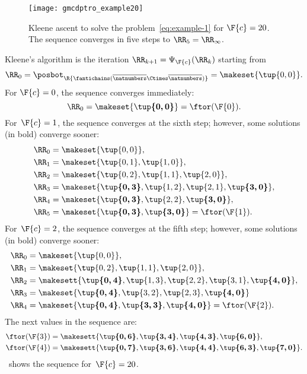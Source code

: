 \begin{figure}
    \centering
    \texttt{[image: gmcdptro\_example20]}
    \caption{
        Kleene ascent to solve the problem~\cref{eq:example-1} for $\F{c}=20$.
        The sequence converges in five steps to $\RR_{5}=\RR_{\infty}$.
    }
    \label{fig:example24}
\end{figure}
%
Kleene's algorithm is the iteration $\RR_{k+1}=\Psi_{\F{c}}(\RR_{k})$ starting from
\begin{equation}
    \RR_{0}
    =
    \posbot_{\R{\fantichains(\overline{\natnumbers}\Ctimes\overline{\natnumbers})}}
    =\makeset{\tup{ 0,0} }.
\end{equation}
%
For $\F{c}=0$, the sequence converges immediately:
%
\begin{equation}
    \RR_{0}=\makeset{\boldsymbol{\tup{0,0}}}=\ftor(\F{0}).
\end{equation}
%
For~$\F{c}=1$, the sequence converges at the sixth step; however, some solutions (in bold) converge sooner:
%
\begin{align*}
    \RR_{0} & =\makeset{\tup{0,0} }, \\
    \RR_{1} & =\makeset{\tup{0,1},\tup{1,0}}, \\
    \RR_{2} & =\makeset{\tup{0,2},\tup{1,1}, \tup{2,0}}, \\
    \RR_{3} & =\makeset{\boldsymbol{\tup{0,3}},\tup{1,2}, \tup{2,1},\boldsymbol{\tup{3,0}}}, \\
    \RR_{4} & =\makeset{\boldsymbol{\tup{0,3}},\tup{2,2},\boldsymbol{\tup{3,0}}}, \\
    \RR_{5} & =\makeset{\boldsymbol{\tup{0,3}},\boldsymbol{\tup{3,0}}}=\ftor(\F{1}).
\end{align*}
%
For~$\F{c}=2$, the sequence converges at the fifth step; however, some solutions (in bold) converge sooner:
%
\begin{align*}
    \RR_{0} & =\makeset{\tup{ 0,0} }, \\
    \RR_{1} & =\makeset{\tup{ 0,2} ,\tup{ 1,1} ,\tup{ 2,0} }, \\
    \RR_{2} & =\makesett{ \boldsymbol{\tup{ 0,4} }, \tup{1,3}, \tup{2,2}, \tup{3,1}, \boldsymbol{\tup{ 4,0} }} , \\
    \RR_{3} & =\makeset{\boldsymbol{\tup{0,4} },\tup{ 3,2}, \tup{2,3}, \boldsymbol{\tup{ 4,0} }} \\
    \RR_{4} & =\makeset{\boldsymbol{\tup{0,4} },\boldsymbol{\tup{ 3,3}},\boldsymbol{\tup{ 4,0} }}=\ftor(\F{2}).
\end{align*}
%
The next values in the sequence are:
%
\begin{align*}
    \ftor(\F{3}) & =\makesett{ \boldsymbol{\tup{ 0,6} },\boldsymbol{\tup{ 3,4} },\boldsymbol{\tup{ 4,3} },\boldsymbol{\tup{ 6,0} }} , \\
    \ftor(\F{4}) & =\makesett{ \boldsymbol{\tup{ 0,7} },\boldsymbol{\tup{ 3,6} },\boldsymbol{\tup{ 4,4} },\boldsymbol{\tup{ 6,3} },\boldsymbol{\tup{ 7,0} }} .
\end{align*}
%
~shows the sequence for~$\F{c}=20$.


